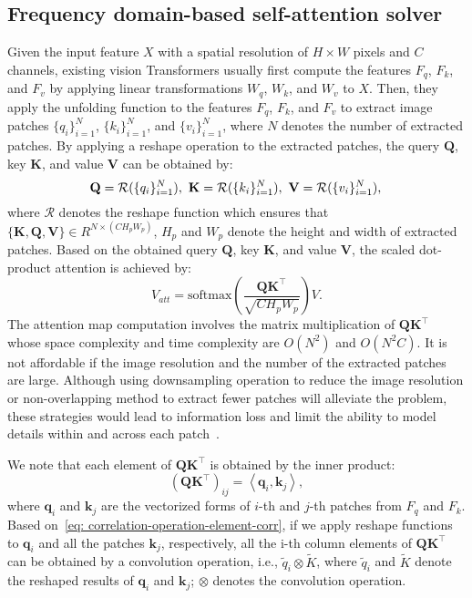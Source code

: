 \documentclass[10pt,twocolumn,letterpaper]{article}
\begin{document}
\subsection{Frequency domain-based self-attention solver}
Given the input feature $X$ with a spatial resolution of $H\times W$ pixels and $C$ channels, existing vision Transformers usually first compute the features $F_q$, $F_k$, and $F_v$ by applying linear transformations ${W}_q$, ${W}_k$, and ${W}_v$ to $X$.
Then, they apply the unfolding function to the features $F_q$, $F_k$, and $F_v$ to extract image patches $\{q_i\}_{i= 1}^{N}$, $\{k_i\}_{i= 1}^{N}$, and $\{v_i\}_{i= 1}^{N}$, where $N$ denotes the number of extracted patches.
By applying a reshape operation to the extracted patches, the query $\mathbf{Q}$, key $\mathbf{K}$, and value $\mathbf{V}$ can be obtained by:
\begin{equation}
\label{eq: patch-divide}
\mathbf{Q} =  \mathcal{R}(\{q_i\}_{i= 1}^{N}), \
\mathbf{K} =  \mathcal{R}(\{k_i\}_{i= 1}^{N}), \
\mathbf{V} =  \mathcal{R}(\{v_i\}_{i= 1}^{N}), \\
\end{equation}
where $\mathcal{R}$ denotes the reshape function which ensures that $\{\mathbf{K}, \mathbf{Q}, \mathbf{V}\}\in R^{N\times (CH_pW_p)}$, $H_p$ and $W_p$ denote the height and width of extracted patches.
Based on the obtained query $\mathbf{Q}$, key $\mathbf{K}$, and value $\mathbf{V}$, the scaled dot-product attention is achieved by:
\begin{equation}
V_{att} = \mathrm{softmax}\left(\frac{\mathbf{QK}^{\top}}{\sqrt{CH_pW_p}}\right)V.
\label{eq: attention-transformer-ori}
\end{equation}
The attention map computation involves the matrix multiplication of $\mathbf{QK}^{\top}$ whose space complexity and time complexity are $O(N^2)$ and $O(N^2C)$.
It is not affordable if the image resolution and the number of the extracted patches are large.
Although using downsampling operation to reduce the image resolution or non-overlapping method to extract fewer patches will alleviate the problem,
these strategies would lead to information loss and limit the ability to model details within and across each patch~\cite{cotransformer}.

We note that each element of $\mathbf{QK}^{\top}$ is obtained by the inner product:
\begin{equation}
\left(\mathbf{QK}^{\top}\right)_{ij} = \left<\mathbf{q}_i,\mathbf{k}_{j}\right>,
\label{eq: correlation-operation-element-corr}
\end{equation}
where $\mathbf{q}_i$ and $\mathbf{k}_j$ are the vectorized forms of $i$-th and $j$-th patches from $F_q$ and $F_k$.
Based on~\eqref{eq: correlation-operation-element-corr}, if we apply reshape functions to $\mathbf{q}_i$ and all the patches $\mathbf{k}_{j}$, respectively, all the i-th column elements of $\mathbf{QK}^{\top}$ can be obtained by a convolution operation, i.e., $\widetilde{q}_i\otimes \widetilde{K}$, where $\widetilde{q}_i$ and $\widetilde{K}$ denote the reshaped results of $\mathbf{q}_i$ and $\mathbf{k}_{j}$; $\otimes$ denotes the convolution operation.
\end{document}
